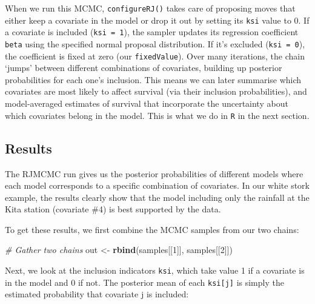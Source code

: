 \documentclass[
  12pt,
]{krantz}
\newenvironment{Shaded}{\begin{snugshade}}{\end{snugshade}}
\newcommand{\CommentTok}[1]{\textcolor[rgb]{0.56,0.35,0.01}{\textit{#1}}}
\newcommand{\DecValTok}[1]{\textcolor[rgb]{0.00,0.00,0.81}{#1}}
\newcommand{\FunctionTok}[1]{\textcolor[rgb]{0.13,0.29,0.53}{\textbf{#1}}}
\newcommand{\NormalTok}[1]{#1}
\newcommand{\OtherTok}[1]{\textcolor[rgb]{0.56,0.35,0.01}{#1}}
\begin{document}
When we run this MCMC, \texttt{configureRJ()} takes care of proposing moves that either keep a covariate in the model or drop it out by setting its \texttt{ksi} value to 0. If a covariate is included (\texttt{ksi\ =\ 1}), the sampler updates its regression coefficient \texttt{beta} using the specified normal proposal distribution. If it's excluded (\texttt{ksi\ =\ 0}), the coefficient is fixed at zero (our \texttt{fixedValue}). Over many iterations, the chain `jumps' between different combinations of covariates, building up posterior probabilities for each one's inclusion. This means we can later summarise which covariates are most likely to affect survival (via their inclusion probabilities), and model-averaged estimates of survival that incorporate the uncertainty about which covariates belong in the model. This is what we do in \texttt{R} in the next section.

\subsection{Results}\label{results}

The RJMCMC run gives us the posterior probabilities of different models where each model corresponds to a specific combination of covariates. In our white stork example, the results clearly show that the model including only the rainfall at the Kita station (covariate \#4) is best supported by the data.

To get these results, we first combine the MCMC samples from our two chains:

\begin{Shaded}
\begin{Highlighting}[]
\CommentTok{\# Gather two chains}
\NormalTok{out }\OtherTok{\textless{}{-}} \FunctionTok{rbind}\NormalTok{(samples[[}\DecValTok{1}\NormalTok{]], samples[[}\DecValTok{2}\NormalTok{]])}
\end{Highlighting}
\end{Shaded}

Next, we look at the inclusion indicators \texttt{ksi}, which take value 1 if a covariate is in the model and 0 if not. The posterior mean of each \texttt{ksi{[}j{]}} is simply the estimated probability that covariate j is included:
\end{document}

